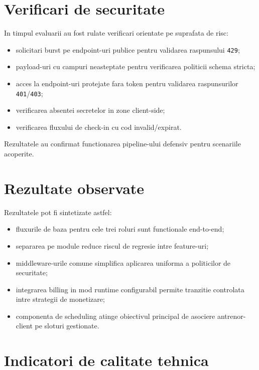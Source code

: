 \section{Verificari de securitate}

In timpul evaluarii au fost rulate verificari orientate pe suprafata de risc:
\begin{itemize}[leftmargin=1.2cm]
    \item solicitari burst pe endpoint-uri publice pentru validarea raspunsului \texttt{429};
    \item payload-uri cu campuri neasteptate pentru verificarea politicii schema stricta;
    \item acces la endpoint-uri protejate fara token pentru validarea raspunsurilor \texttt{401}/\texttt{403};
    \item verificarea absentei secretelor in zone client-side;
    \item verificarea fluxului de check-in cu cod invalid/expirat.
\end{itemize}

Rezultatele au confirmat functionarea pipeline-ului defensiv pentru scenariile acoperite.

\section{Rezultate observate}

Rezultatele pot fi sintetizate astfel:
\begin{itemize}[leftmargin=1.2cm]
    \item fluxurile de baza pentru cele trei roluri sunt functionale end-to-end;
    \item separarea pe module reduce riscul de regresie intre feature-uri;
    \item middleware-urile comune simplifica aplicarea uniforma a politicilor de securitate;
    \item integrarea billing in mod runtime configurabil permite tranzitie controlata intre strategii de monetizare;
    \item componenta de scheduling atinge obiectivul principal de asociere antrenor-client pe sloturi gestionate.
\end{itemize}

\section{Indicatori de calitate tehnica}

